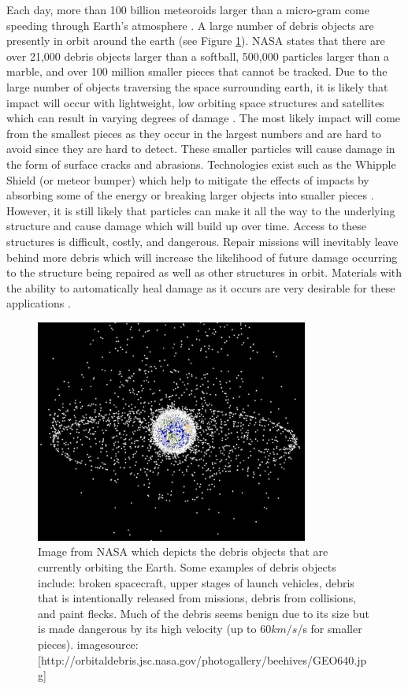 
Each day, more than 100 billion meteoroids larger than a micro-gram come speeding through Earth's atmosphere \cite{Close2010}. A large number of debris objects are presently in orbit around the earth (see Figure \ref{fig:orbitalDebris}). NASA states that there are over 21,000 debris objects larger than a softball, 500,000 particles larger than a marble, and over 100 million smaller pieces that cannot be tracked. Due to the large number of objects traversing the space surrounding earth, it is likely that impact will occur with lightweight, low orbiting space structures and satellites which can result in varying degrees of damage \cite{NASAOD2012}. The most likely impact will come from the smallest pieces as they occur in the largest numbers and are hard to avoid since they are hard to detect. These smaller particles will cause damage in the form of surface cracks and abrasions. Technologies exist such as the Whipple Shield (or meteor bumper) which help to mitigate the effects of impacts by absorbing some of the energy or breaking larger objects into smaller pieces \cite{NASAHVIT2012}. However, it is still likely that particles can make it all the way to the underlying structure and cause damage which will build up over time. Access to these structures is difficult, costly, and dangerous. Repair missions will inevitably leave behind more debris which will increase the likelihood of future damage occurring to the structure being repaired as well as other structures in orbit. Materials with the ability to automatically heal damage as it occurs are very desirable for these applications \cite{Lee2009}.

\begin{figure}[ht!]
\centering
\includegraphics[width=0.8\textwidth]{eps_pics/orbitalDebris}
\caption{ Image from NASA which depicts the debris objects that are currently orbiting the Earth. Some examples of debris objects include: broken spacecraft, upper stages of launch vehicles, debris that is intentionally released from missions, debris from collisions, and paint flecks. Much of the debris seems benign due to its size but is made dangerous by its high velocity (up to $60 km/s$/s for smaller pieces).
\newline
imagesource:[http://orbitaldebris.jsc.nasa.gov/photogallery/beehives/GEO640.jpg]
	 \label{fig:orbitalDebris}} 
\end{figure}


